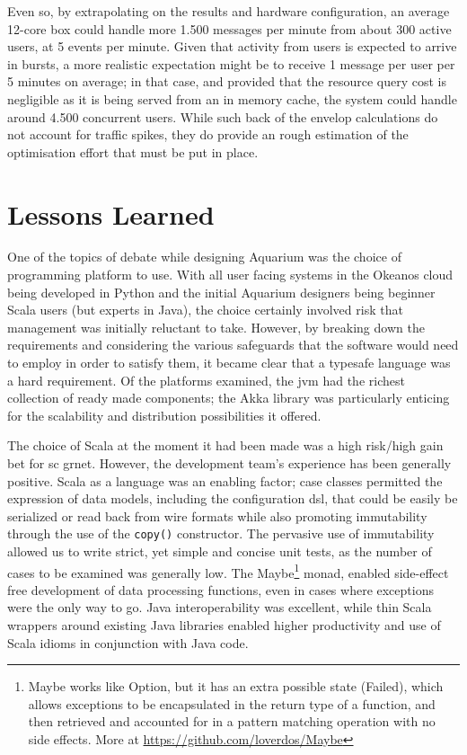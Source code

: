 \documentclass[preprint,10pt]{sigplanconf}
\begin{document}
Even so, by extrapolating on the results and hardware configuration, an average
12-core box could handle more 1.500 messages per minute from about 300 active
users, at 5 events per minute. Given that activity from users is expected to
arrive in bursts, a more realistic expectation might be to receive 1 message
per user per 5 minutes on average; in that case, and provided that the resource
query cost is negligible as it is being served from an in memory cache, the
system could handle around 4.500 concurrent users. While such back of the
envelop calculations do not account for traffic spikes, they do provide an
rough estimation of the optimisation effort that must be put in place. 


\section{Lessons Learned}

One of the topics of debate while designing Aquarium was the choice of
programming platform to use. With all user facing systems in the Okeanos cloud
being developed in Python and the initial Aquarium designers being beginner
Scala users (but experts in Java), the choice certainly involved risk that
management was initially reluctant to take. However, by breaking down the
requirements and considering the various safeguards that the software would
need to employ in order to satisfy them, it became clear that a
typesafe language was a hard requirement. Of the platforms examined, the {\sc
jvm} had the richest collection of ready made components; the Akka library was
particularly enticing for the scalability and distribution possibilities it
offered.

The choice of Scala at the moment it had been made was a high risk/high gain
bet for {sc grnet}. However, the development team's experience has been generally
positive. Scala as a language was an enabling factor; case classes permitted
the expression of data models, including the configuration {\sc dsl}, that
could be easily be serialized or read back from wire formats while also
promoting immutability through the use of the \texttt{copy()} constructor. The
pervasive use of immutability allowed us to write strict, yet simple and
concise unit tests, as the number of cases to be examined was generally low.
The \textsf{Maybe}\footnote{\textsf{Maybe} works like \textsf{Option}, but it
has an extra possible state (\textsf{Failed}), which allows exceptions to be
encapsulated in the return type of a function, and then retrieved and accounted
for in a pattern matching operation with no side effects. More at
\url{https://github.com/loverdos/Maybe}} monad, enabled side-effect free
development of data processing functions, even in cases where exceptions were
the only way to go. Java interoperability was excellent, while thin Scala
wrappers around existing Java libraries enabled higher productivity and use of
Scala idioms in conjunction with Java code.
\end{document}
